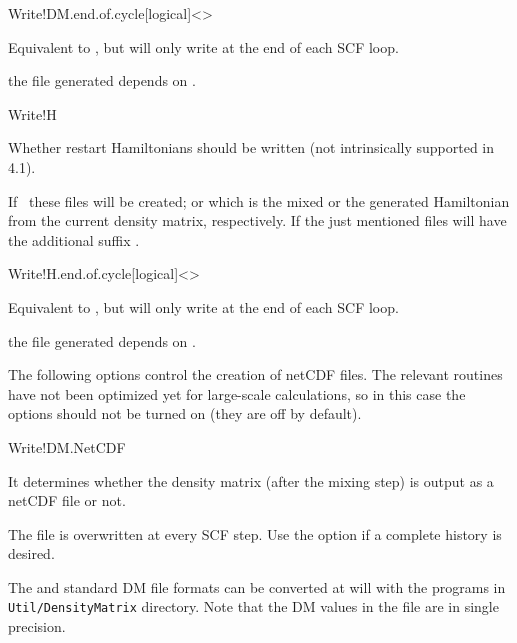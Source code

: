 \begin{fdfentry}{Write!DM.end.of.cycle}[logical]<>

  Equivalent to , but will only write at the end of each
  SCF loop.

  \note the file generated depends on .

\end{fdfentry}  

\begin{fdflogicalF}{Write!H}

  Whether restart Hamiltonians should be written (not intrinsically
  supported in 4.1). 

  If \fdftrue\ these files will be created;  or
   which is the mixed or the generated Hamiltonian from
  the current density matrix, respectively. If
   the just mentioned files will have the
  additional suffix .
  
\end{fdflogicalF}

\begin{fdfentry}{Write!H.end.of.cycle}[logical]<>

  Equivalent to , but will only write at the end of each
  SCF loop.

  \note the file generated depends on .

\end{fdfentry}  

The following options control the creation of netCDF files. The
relevant routines have not been optimized yet for large-scale
calculations, so in this case the options should not be turned on
(they are off by default).


\begin{fdflogicalT}{Write!DM.NetCDF}
  
  It determines whether the density matrix (after the mixing step) is
  output as a  netCDF file or not.

  The file is overwritten at every SCF step. Use the
   option if a complete history is
  desired.

  The  and standard DM file formats can be converted at
  will with the programs in \texttt{Util/DensityMatrix}
  directory. Note that the DM values in the  file are in
  single precision.

\end{fdflogicalT}

